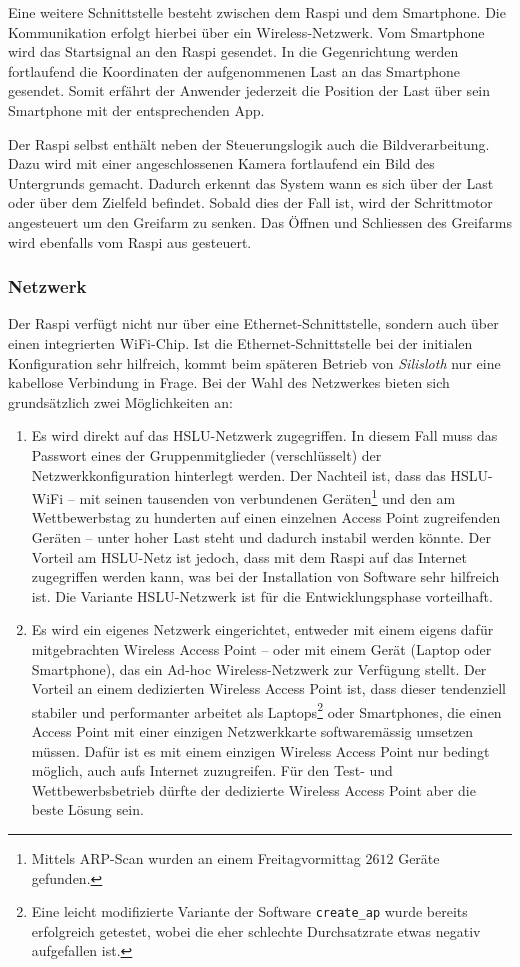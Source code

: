 Eine weitere Schnittstelle besteht zwischen dem Raspi und dem Smartphone. Die Kommunikation erfolgt hierbei über ein Wireless-Netzwerk. Vom Smartphone wird das Startsignal an den Raspi gesendet. In die Gegenrichtung werden fortlaufend die Koordinaten der aufgenommenen Last an das Smartphone gesendet. Somit erfährt der Anwender jederzeit die Position der Last über sein Smartphone mit der entsprechenden App.

Der Raspi selbst enthält neben der Steuerungslogik auch die Bildverarbeitung. Dazu wird mit einer angeschlossenen Kamera fortlaufend ein Bild des Untergrunds gemacht. Dadurch erkennt das System wann es sich über der Last oder über dem Zielfeld befindet. Sobald dies der Fall ist, wird der Schrittmotor angesteuert um den Greifarm zu senken. Das Öffnen und Schliessen des Greifarms wird ebenfalls vom Raspi aus gesteuert.

\subsubsection{Netzwerk}
\label{sec:netzwerk}

Der Raspi verfügt nicht nur über eine Ethernet-Schnittstelle, sondern auch über einen integrierten WiFi-Chip. Ist die Ethernet-Schnittstelle bei der initialen Konfiguration sehr hilfreich, kommt beim späteren Betrieb von \textit{Silisloth} nur eine kabellose Verbindung in Frage. Bei der Wahl des Netzwerkes bieten sich grundsätzlich zwei Möglichkeiten an:

\begin{enumerate}
\item Es wird direkt auf das HSLU-Netzwerk zugegriffen. In diesem Fall muss das Passwort eines der Gruppenmitglieder (verschlüsselt) der Netzwerkkonfiguration hinterlegt werden. Der Nachteil ist, dass das HSLU-WiFi -- mit seinen tausenden von verbundenen Geräten\footnote{Mittels ARP-Scan wurden an einem Freitagvormittag $2612$ Geräte gefunden.} und den am Wettbewerbstag zu hunderten auf einen einzelnen Access Point zugreifenden Geräten -- unter hoher Last steht und dadurch instabil werden könnte. Der Vorteil am HSLU-Netz ist jedoch, dass mit dem Raspi auf das Internet zugegriffen werden kann, was bei der Installation von Software sehr hilfreich ist. Die Variante HSLU-Netzwerk ist für die Entwicklungsphase vorteilhaft.
\item Es wird ein eigenes Netzwerk eingerichtet, entweder mit einem eigens dafür mitgebrachten Wireless Access Point -- oder mit einem Gerät (Laptop oder Smartphone), das ein Ad-hoc Wireless-Netzwerk zur Verfügung stellt. Der Vorteil an einem dedizierten Wireless Access Point ist, dass dieser tendenziell stabiler und performanter arbeitet als Laptops\footnote{Eine leicht modifizierte Variante der Software \texttt{create\_ap} wurde bereits erfolgreich getestet, wobei die eher schlechte Durchsatzrate etwas negativ aufgefallen ist.} oder Smartphones, die einen Access Point mit einer einzigen Netzwerkkarte softwaremässig umsetzen müssen. Dafür ist es mit einem einzigen Wireless Access Point nur bedingt möglich, auch aufs Internet zuzugreifen. Für den Test- und Wettbewerbsbetrieb dürfte der dedizierte Wireless Access Point aber die beste Lösung sein.
\end{enumerate}

